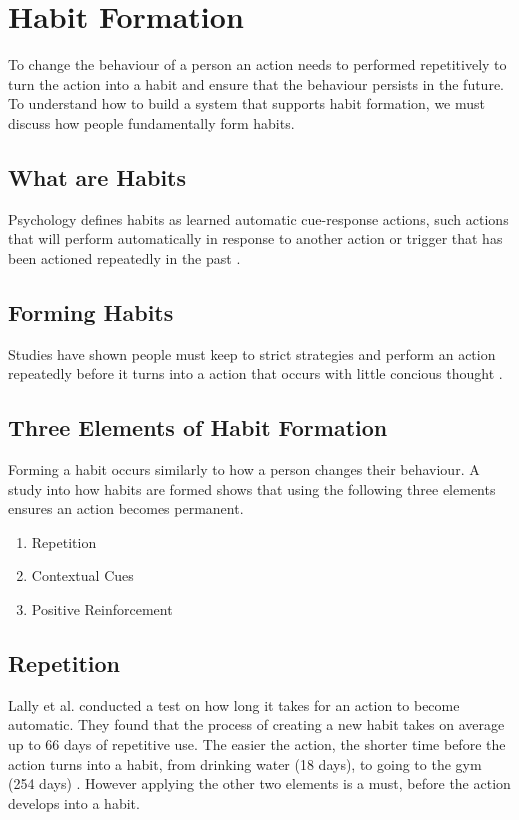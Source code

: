 \newpage

\section{Habit Formation}
To change the behaviour of a person an action needs to performed repetitively to turn the action into a habit and ensure that the behaviour persists in the future.\newline
To understand how to build a system that supports habit formation, we must discuss how people fundamentally form habits.

\subsection{What are Habits}
Psychology defines habits as learned automatic cue-response actions, such actions that will perform automatically in response to another action or trigger that has been actioned repeatedly in the past \cite{article_the_habitual_consumer}.

\subsection{Forming Habits}
Studies have shown people must keep to strict strategies and perform an action repeatedly before it turns into a action that occurs with little concious thought \cite{article_promoting_habit_formation}.

\subsection{Three Elements of Habit Formation}
Forming a habit occurs similarly to how a person changes their behaviour. A study \cite{article_experiences_of_habit_formation} into how habits are formed shows that using the following three elements ensures an action becomes permanent.

\begin{enumerate}
  \item Repetition
  \item Contextual Cues
  \item Positive Reinforcement
\end{enumerate}

\subsection*{Repetition}
Lally et al. \cite{article_how_habits_formed_modelling_habit_formation} conducted a test on how long it takes for an action to become automatic. They found that the process of creating a new habit takes on average up to 66 days of repetitive use. The easier the action, the shorter time before the action turns into a habit, from drinking water (18 days), to going to the gym (254 days) \cite{article_how_habits_formed_modelling_habit_formation}. However applying the other two elements is a must, before the action develops into a habit.


